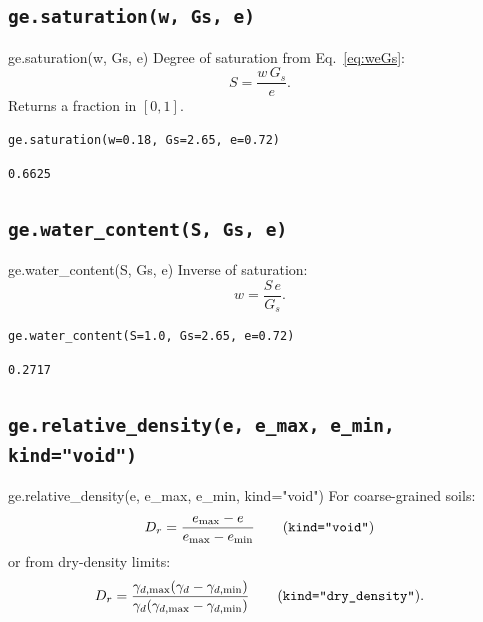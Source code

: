 \documentclass[11pt,a4paper,openany]{book}
\begin{document}
\subsection{\texttt{ge.saturation(w, Gs, e)}}

\begin{funcbox}{ge.saturation(w, Gs, e)}
Degree of saturation from Eq.~\ref{eq:weGs}:
\[
S = \frac{w\,G_s}{e}.
\]
Returns a fraction in $[0, 1]$.
\end{funcbox}

\begin{lstlisting}
ge.saturation(w=0.18, Gs=2.65, e=0.72)
\end{lstlisting}
\begin{lstlisting}[style=output]
0.6625
\end{lstlisting}

\subsection{\texttt{ge.water\_content(S, Gs, e)}}

\begin{funcbox}{ge.water\_content(S, Gs, e)}
Inverse of saturation:
\[
w = \frac{S\,e}{G_s}.
\]
\end{funcbox}

\begin{lstlisting}
ge.water_content(S=1.0, Gs=2.65, e=0.72)
\end{lstlisting}
\begin{lstlisting}[style=output]
0.2717
\end{lstlisting}

\subsection{\texttt{ge.relative\_density(e, e\_max, e\_min, kind="void")}}

\begin{funcbox}{ge.relative\_density(e, e\_max, e\_min, kind="void")}
For coarse-grained soils:
\[
D_r = \frac{e_{\max} - e}{e_{\max} - e_{\min}}
   \qquad\text{(\texttt{kind="void"})}
\]
or from dry-density limits:
\[
D_r = \frac{\gamma_{d,\max}(\gamma_d - \gamma_{d,\min})}
           {\gamma_d(\gamma_{d,\max} - \gamma_{d,\min})}
   \qquad\text{(\texttt{kind="dry\_density"})}.
\]
\end{funcbox}
\end{document}
